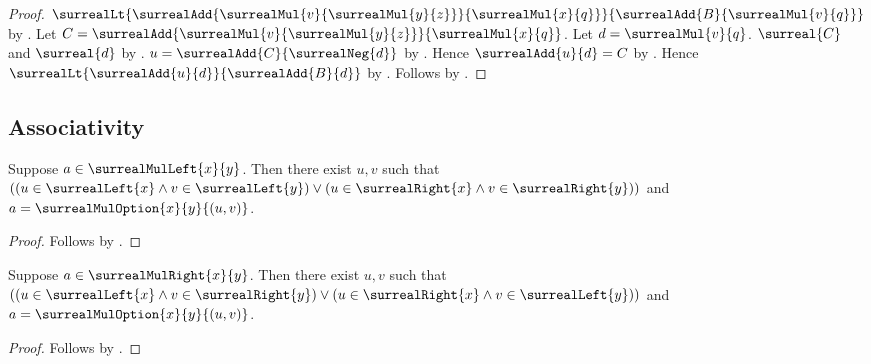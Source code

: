 \begin{proof}
        $\surrealLt
            {\surrealAdd{\surrealMul{v}{\surrealMul{y}{z}}}
                {\surrealMul{x}{q}}}
            {\surrealAdd{B}{\surrealMul{v}{q}}}$
        by
        .
    Let $C=\surrealAdd{\surrealMul{v}{\surrealMul{y}{z}}}
        {\surrealMul{x}{q}}$.
    Let $d=\surrealMul{v}{q}$.
    $\surreal{C}$ and $\surreal{d}$
        by .
    $u=\surrealAdd{C}{\surrealNeg{d}}$
        by .
    Hence $\surrealAdd{u}{d}=C$
        by
        .
    Hence $\surrealLt{\surrealAdd{u}{d}}{\surrealAdd{B}{d}}$
        by \auto.
    Follows by
        .
\end{proof}

\subsection{Associativity}

\begin{corollary}\label{surreal_mul_left_pair_elim}
    Suppose $a\in\surrealMulLeft{x}{y}$.
    Then there exist $u,v$ such that
        $((u\in\surrealLeft{x}\land v\in\surrealLeft{y})
          \lor(u\in\surrealRight{x}\land v\in\surrealRight{y}))$
        and $a=\surrealMulOption{x}{y}{(u,v)}$.
\end{corollary}
\begin{proof}
    Follows by .
\end{proof}

\begin{corollary}\label{surreal_mul_right_pair_elim}
    Suppose $a\in\surrealMulRight{x}{y}$.
    Then there exist $u,v$ such that
        $((u\in\surrealLeft{x}\land v\in\surrealRight{y})
          \lor(u\in\surrealRight{x}\land v\in\surrealLeft{y}))$
        and $a=\surrealMulOption{x}{y}{(u,v)}$.
\end{corollary}
\begin{proof}
    Follows by .
\end{proof}

